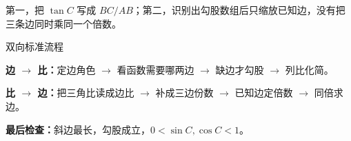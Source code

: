 \documentclass{exam-zh}
\begin{document}
\begin{eduDualExplain}
  \begin{eduExplainLeft}
  \end{eduExplainLeft}

  \begin{eduExplainRight}
      
      
      
  \end{eduExplainRight}
\end{eduDualExplain}




\begin{eduMistakeBox}
第一，把 $\tan C$ 写成 $BC/AB$；第二，识别出勾股数组后只缩放已知边，没有把三条边同时乘同一个倍数。
\end{eduMistakeBox}




\begin{eduSummaryBlock}{\eduIconPin}{双向标准流程}
\begin{eduBulletList}
  \item \textbf{边 $\to$ 比：}定边角色 $\to$ 看函数需要哪两边 $\to$ 缺边才勾股 $\to$ 列比化简。  \item \textbf{比 $\to$ 边：}把三角比读成边比 $\to$ 补成三边份数 $\to$ 已知边定倍数 $\to$ 同倍求边。  \item \textbf{最后检查：}斜边最长，勾股成立，$0<\sin C,\cos C<1$。\end{eduBulletList}
\end{eduSummaryBlock}
\end{document}
